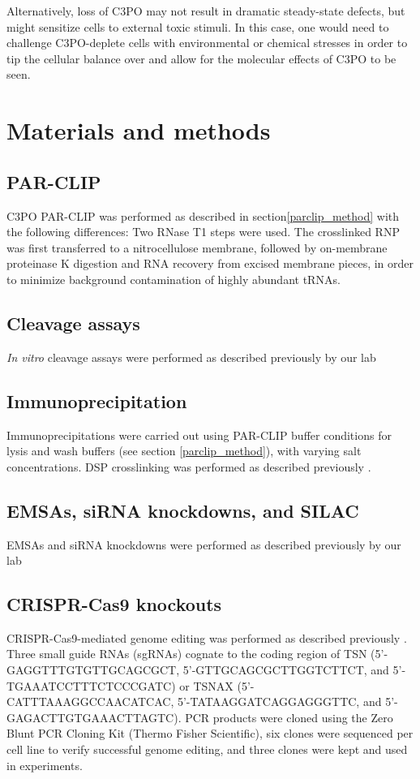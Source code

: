 \documentclass[12pt]{rockefeller}
\begin{document}
Alternatively, loss of C3PO may not result in dramatic steady-state defects, but might sensitize cells to external toxic stimuli. In this case, one would need to challenge C3PO-deplete cells with environmental or chemical stresses in order to tip the cellular balance over and allow for the molecular effects of C3PO to be seen. 

\chapter{Materials and methods}
\section{PAR-CLIP}
C3PO PAR-CLIP was performed as described in section\ref{parclip_method} with the following differences: Two RNase T1 steps were used. The crosslinked RNP was first transferred to a nitrocellulose membrane, followed by on-membrane proteinase K digestion and RNA recovery from excised membrane pieces, in order to minimize background contamination of highly abundant tRNAs. 

\section{Cleavage assays}
\textit{In vitro} cleavage assays were performed as described previously  by our lab \cite{Tian:2011hx} 

\section{Immunoprecipitation}
Immunoprecipitations were carried out using PAR-CLIP buffer conditions for lysis and wash buffers (see section \ref{parclip_method}), with varying salt concentrations. DSP crosslinking was performed as described previously \cite{Popow:2014ita}.

\section{EMSAs, siRNA knockdowns, and SILAC}
EMSAs and siRNA knockdowns were performed as described previously  by our lab \cite{Hafner:2013ee}

\section{CRISPR-Cas9 knockouts}
CRISPR-Cas9-mediated genome editing was performed as described previously \cite{Ran:2013dm}. Three small guide RNAs (sgRNAs) cognate to the coding region of TSN (5'- GAGGTTTGTGTTGCAGCGCT, 5'-GTTGCAGCGCTTGGTCTTCT, \newline and 5'- TGAAATCCTTTCTCCCGATC) or TSNAX (5'- CATTTAAAGGCCAACATCAC, 5'-TATAAGGATCAGGAGGGTTC, and 5'- GAGACTTGTGAAACTTAGTC). PCR products were cloned using the Zero Blunt PCR Cloning Kit (Thermo Fisher Scientific), six clones were sequenced per cell line to verify successful genome editing, and three clones were kept and used in experiments.
\end{document}
